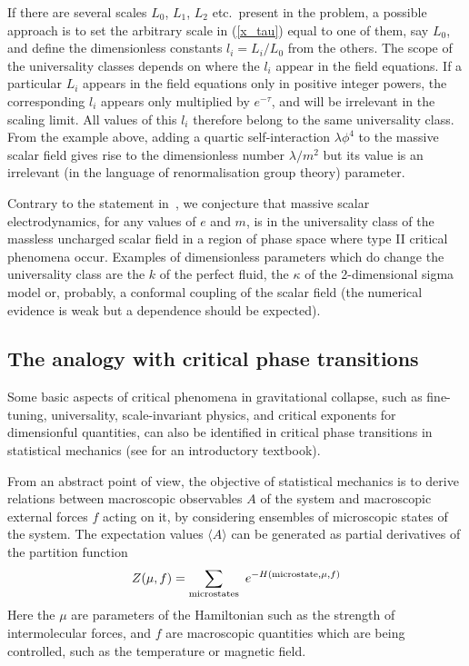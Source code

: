\documentclass{article}
\begin{document}
If there are several scales $L_0$, $L_1$, $L_2$ etc.\ present in the
problem, a possible approach is to set the arbitrary scale in
(\ref{x_tau}) equal to one of them, say $L_0$, and define the
dimensionless constants $l_i=L_i/L_0$ from the others. The scope of
the universality classes depends on where the $l_i$ appear in the
field equations. If a particular $L_i$ appears in the field equations
only in positive integer powers, the corresponding $l_i$ appears only
multiplied by $e^{-\tau}$, and will be irrelevant in the scaling
limit. All values of this $l_i$ therefore belong to the same
universality class. From the example above, adding a quartic
self-interaction $\lambda\phi^4$ to the massive scalar field gives
rise to the dimensionless number $\lambda/m^2$ but its value is an
irrelevant (in the language of renormalisation group theory)
parameter.  

Contrary to the statement in~\cite{GundlachMartin}, we conjecture that
massive scalar electrodynamics, for any values of $e$ and $m$, is in
the universality class of the massless uncharged scalar field in a
region of phase space where type II critical phenomena occur. Examples
of dimensionless parameters which do change the universality class are
the $k$ of the perfect fluid, the $\kappa$ of the 2-dimensional sigma
model or, probably, a conformal coupling of the scalar field
\cite{Choptuik91} (the numerical evidence is weak but a dependence
should be expected).


\subsection{The analogy with critical phase transitions}
\label{section:analogy}


Some basic aspects of critical phenomena in gravitational collapse,
such as fine-tuning, universality, scale-invariant physics, and
critical exponents for dimensionful quantities, can also be identified
in critical phase transitions in statistical mechanics (see
\cite{Yeomans} for an introductory textbook).

From an abstract point of view, the objective of statistical mechanics
is to derive relations between macroscopic observables $A$ of the
system and macroscopic external forces $f$ acting on it, by
considering ensembles of microscopic states of the system. The
expectation values $\langle A\rangle$ can be generated as partial
derivatives of the partition function
\begin{equation}
Z(\mu, f)=\sum_{\rm microstates} \ e^{-  H({\rm
microstate}, \mu, f)}
\end{equation}
Here the $\mu$ are parameters of the Hamiltonian such as the strength
of intermolecular forces, and $f$ are macroscopic quantities which
are being controlled, such as the temperature or magnetic field.
\end{document}
